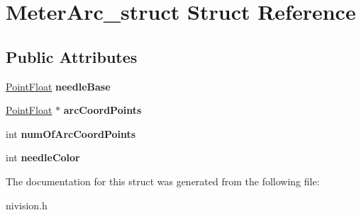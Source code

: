 \hypertarget{structMeterArc__struct}{
\section{MeterArc\_\-struct Struct Reference}
\label{structMeterArc__struct}
}
\subsection*{Public Attributes}
\begin{DoxyCompactItemize}
\item 
\hypertarget{structMeterArc__struct_ae984b2f84588547dd6f430137b89b68f}{
\hyperlink{structPointFloat__struct}{PointFloat} {\bfseries needleBase}}
\label{structMeterArc__struct_ae984b2f84588547dd6f430137b89b68f}

\item 
\hypertarget{structMeterArc__struct_a88c9884926046eed24d5d3437ad6e3b2}{
\hyperlink{structPointFloat__struct}{PointFloat} $\ast$ {\bfseries arcCoordPoints}}
\label{structMeterArc__struct_a88c9884926046eed24d5d3437ad6e3b2}

\item 
\hypertarget{structMeterArc__struct_a4ef9a89cd7ff1db40b1302b85a6efdb3}{
int {\bfseries numOfArcCoordPoints}}
\label{structMeterArc__struct_a4ef9a89cd7ff1db40b1302b85a6efdb3}

\item 
\hypertarget{structMeterArc__struct_a0643dc0af10bcff3417798cd0f4c4efd}{
int {\bfseries needleColor}}
\label{structMeterArc__struct_a0643dc0af10bcff3417798cd0f4c4efd}

\end{DoxyCompactItemize}


The documentation for this struct was generated from the following file:\begin{DoxyCompactItemize}
\item 
nivision.h\end{DoxyCompactItemize}
